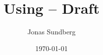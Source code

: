 \documentclass[a4paper,11pt,titlepage,draft]{article}
\title{Using \strsafe{} -- Draft}
\date{\today}
\author{Jonas Sundberg}
\begin{document}
\maketitle

\begin{abstract}

\end{abstract}

\tableofcontents
\clearpage




\end{document}
